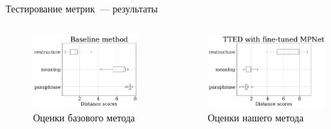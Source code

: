 \documentclass{beamer}
\begin{document}

\begin{frame}{Тестирование метрик~--- результаты}

\begin{columns}

\begin{figure}
    \centering
    \includegraphics[width=\textwidth]{img/baseline_results.png}
    \caption{Оценки базового метода}
    \label{fig:baseline}
\end{figure}

\begin{figure}
    \centering
    \includegraphics[width=\textwidth]{img/paraphrase_mpnet_results.png}
    \caption{Оценки нашего метода}
    \label{fig:results}
\end{figure}


\end{columns}
\end{frame}
\end{document}
